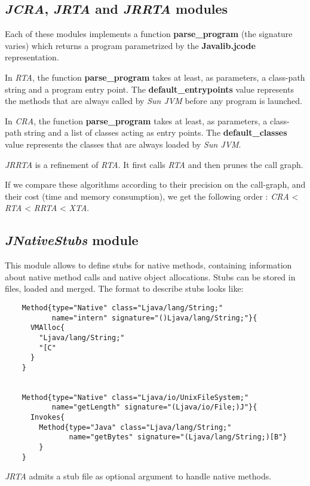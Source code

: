 \documentclass{article}
\begin{document}
\subsection{\emph{JCRA}, \emph{JRTA} and \emph{JRRTA} modules}

Each of these modules implements a function \textbf{parse\_program}
(the signature varies) which returns a program parametrized by the
\textbf{Javalib.jcode} representation.

In \emph{RTA}, the function \textbf{parse\_program} takes at least,
as parameters, a class-path string and a program entry point. The
\textbf{default\_entrypoints} value represents the methods that are
always called by \emph{Sun JVM} before any program is launched.

In \emph{CRA}, the function \textbf{parse\_program} takes at least,
as parameters, a class-path string and a list of classes acting as
entry points. The \textbf{default\_classes} value represents the
classes that are always loaded by \emph{Sun JVM}.

\emph{JRRTA} is a refinement of \emph{RTA}. It first calls
\emph{RTA} and then prunes the call graph.

If we compare these algorithms according to their precision on the
call-graph, and their cost (time and memory consumption), we get
the following order : \emph{CRA} \textless{} \emph{RTA} \textless{}
\emph{RRTA} \textless{} \emph{XTA}.

\subsection{\emph{JNativeStubs} module}

This module allows to define stubs for native methods, containing
information about native method calls and native object
allocations. Stubs can be stored in files, loaded and merged. The
format to describe stubs looks like:

\begin{verbatim}
    Method{type="Native" class="Ljava/lang/String;"
           name="intern" signature="()Ljava/lang/String;"}{
      VMAlloc{
        "Ljava/lang/String;"
        "[C"
      }
    }


    Method{type="Native" class="Ljava/io/UnixFileSystem;"
           name="getLength" signature="(Ljava/io/File;)J"}{
      Invokes{
        Method{type="Java" class="Ljava/lang/String;"
               name="getBytes" signature="(Ljava/lang/String;)[B"}
        }
    }
\end{verbatim}
\emph{JRTA} admits a stub file as optional argument to handle
native methods.
\end{document}
